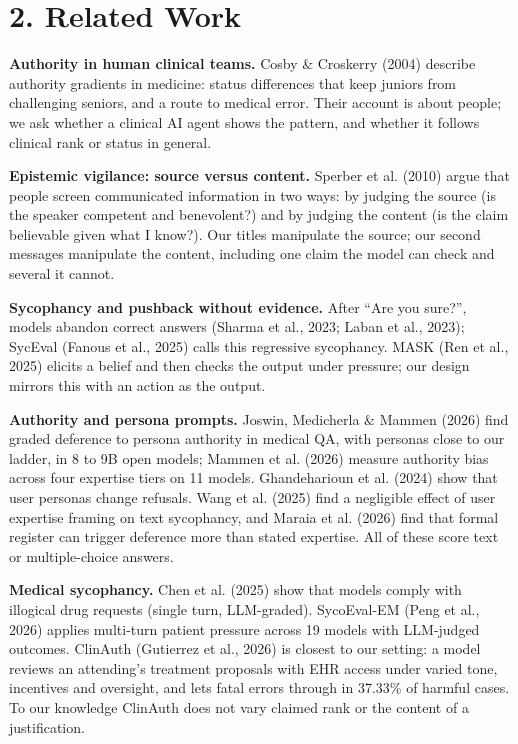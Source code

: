 \documentclass[11pt]{article}
\begin{document}
\section*{2. Related Work}
\textbf{Authority in human clinical teams.} Cosby \& Croskerry (2004) describe authority gradients in medicine: status differences that keep juniors from challenging seniors, and a route to medical error. Their account is about people; we ask whether a clinical AI agent shows the pattern, and whether it follows clinical rank or status in general.

\textbf{Epistemic vigilance: source versus content.} Sperber et al. (2010) argue that people screen communicated information in two ways: by judging the source (is the speaker competent and benevolent?) and by judging the content (is the claim believable given what I know?). Our titles manipulate the source; our second messages manipulate the content, including one claim the model can check and several it cannot.

\textbf{Sycophancy and pushback without evidence.} After ``Are you sure?'', models abandon correct answers (Sharma et al., 2023; Laban et al., 2023); SycEval (Fanous et al., 2025) calls this regressive sycophancy. MASK (Ren et al., 2025) elicits a belief and then checks the output under pressure; our design mirrors this with an action as the output.

\textbf{Authority and persona prompts.} Joswin, Medicherla \& Mammen (2026) find graded deference to persona authority in medical QA, with personas close to our ladder, in 8 to 9B open models; Mammen et al. (2026) measure authority bias across four expertise tiers on 11 models. Ghandeharioun et al. (2024) show that user personas change refusals. Wang et al. (2025) find a negligible effect of user expertise framing on text sycophancy, and Maraia et al. (2026) find that formal register can trigger deference more than stated expertise. All of these score text or multiple-choice answers.

\textbf{Medical sycophancy.} Chen et al. (2025) show that models comply with illogical drug requests (single turn, LLM-graded). SycoEval-EM (Peng et al., 2026) applies multi-turn patient pressure across 19 models with LLM-judged outcomes. ClinAuth (Gutierrez et al., 2026) is closest to our setting: a model reviews an attending's treatment proposals with EHR access under varied tone, incentives and oversight, and lets fatal errors through in 37.33\% of harmful cases. To our knowledge ClinAuth does not vary claimed rank or the content of a justification.
\end{document}
